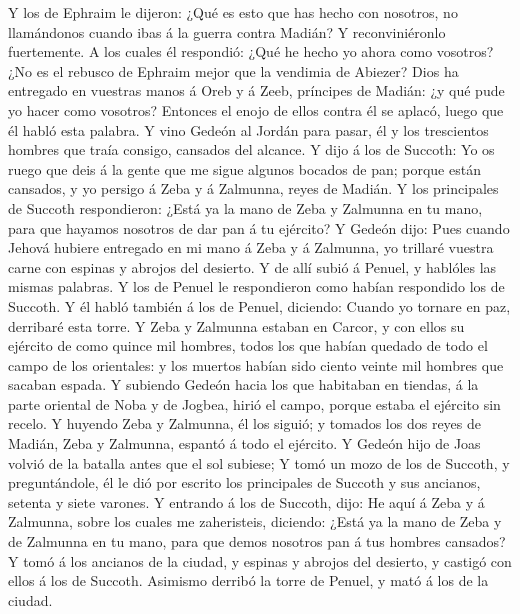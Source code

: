  Y los de Ephraim le dijeron: ¿Qué es esto que has hecho
con nosotros, no llamándonos cuando ibas á la guerra contra Madián? Y
reconviniéronlo fuertemente.  A los cuales él respondió:
¿Qué he hecho yo ahora como vosotros? ¿No es el rebusco de Ephraim mejor
que la vendimia de Abiezer?  Dios ha entregado en vuestras
manos á Oreb y á Zeeb, príncipes de Madián: ¿y qué pude yo hacer como
vosotros? Entonces el enojo de ellos contra él se aplacó, luego que él
habló esta palabra.  Y vino Gedeón al Jordán para pasar,
él y los trescientos hombres que traía consigo, cansados del alcance.
 Y dijo á los de Succoth: Yo os ruego que deis á la gente
que me sigue algunos bocados de pan; porque están cansados, y yo persigo
á Zeba y á Zalmunna, reyes de Madián.  Y los principales
de Succoth respondieron: ¿Está ya la mano de Zeba y Zalmunna en tu mano,
para que hayamos nosotros de dar pan á tu ejército?  Y
Gedeón dijo: Pues cuando Jehová hubiere entregado en mi mano á Zeba y á
Zalmunna, yo trillaré vuestra carne con espinas y abrojos del desierto.
 Y de allí subió á Penuel, y hablóles las mismas palabras.
Y los de Penuel le respondieron como habían respondido los de Succoth.
 Y él habló también á los de Penuel, diciendo: Cuando yo
tornare en paz, derribaré esta torre.  Y Zeba y Zalmunna
estaban en Carcor, y con ellos su ejército de como quince mil hombres,
todos los que habían quedado de todo el campo de los orientales: y los
muertos habían sido ciento veinte mil hombres que sacaban espada.
 Y subiendo Gedeón hacia los que habitaban en tiendas, á
la parte oriental de Noba y de Jogbea, hirió el campo, porque estaba el
ejército sin recelo.  Y huyendo Zeba y Zalmunna, él los
siguió; y tomados los dos reyes de Madián, Zeba y Zalmunna, espantó á
todo el ejército.  Y Gedeón hijo de Joas volvió de la
batalla antes que el sol subiese;  Y tomó un mozo de los
de Succoth, y preguntándole, él le dió por escrito los principales de
Succoth y sus ancianos, setenta y siete varones.  Y
entrando á los de Succoth, dijo: He aquí á Zeba y á Zalmunna, sobre los
cuales me zaheristeis, diciendo: ¿Está ya la mano de Zeba y de Zalmunna
en tu mano, para que demos nosotros pan á tus hombres cansados?
 Y tomó á los ancianos de la ciudad, y espinas y abrojos
del desierto, y castigó con ellos á los de Succoth. 
Asimismo derribó la torre de Penuel, y mató á los de la ciudad.
